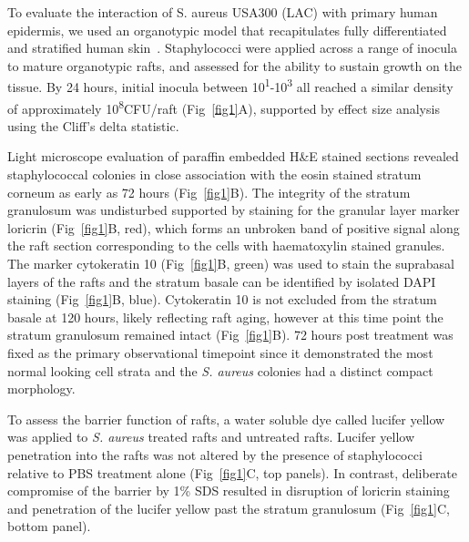 \documentclass[10pt,letterpaper]{article}
\begin{document}
To evaluate the interaction of S. aureus USA300 (LAC) with primary human epidermis, we used an organotypic model that recapitulates fully differentiated and stratified human skin~\cite{simpson_rna_2010}.
Staphylococci were applied across a range of inocula to mature organotypic rafts, and assessed for the ability to sustain growth on the tissue.
By 24 hours, initial inocula between 10\textsuperscript{1}-10\textsuperscript{3} all reached a similar density of approximately 10\textsuperscript{8}CFU/raft (Fig~\ref{fig1}A), supported by effect size analysis using the Cliff's delta statistic.

Light microscope evaluation of paraffin embedded H\&E stained sections revealed staphylococcal colonies in close association with the eosin stained stratum corneum as early as 72 hours (Fig~\ref{fig1}B).
The integrity of the stratum granulosum was undisturbed supported by staining for the granular layer marker loricrin (Fig~\ref{fig1}B, red), which forms an unbroken band of positive signal along the raft section corresponding to the cells with haematoxylin stained granules.
The marker cytokeratin 10 (Fig~\ref{fig1}B, green) was used to stain the suprabasal layers of the rafts and the stratum basale can be identified by isolated DAPI staining (Fig~\ref{fig1}B, blue).
Cytokeratin 10 is not excluded from the stratum basale at 120 hours, likely reflecting raft aging, however at this time point the stratum granulosum remained intact (Fig~\ref{fig1}B).
72 hours post treatment was fixed as the primary observational timepoint since it demonstrated the most normal looking cell strata and the \textit{S. aureus} colonies had a distinct compact morphology.

To assess the barrier function of rafts, a water soluble dye called lucifer yellow was applied to \textit{S. aureus} treated rafts and untreated rafts.
Lucifer yellow penetration into the rafts was not altered by the presence of staphylococci relative to PBS treatment alone (Fig~\ref{fig1}C, top panels).
In contrast, deliberate compromise of the barrier by 1\% SDS resulted in disruption of loricrin staining and penetration of the lucifer yellow past the stratum granulosum (Fig~\ref{fig1}C, bottom panel).

\end{document}
